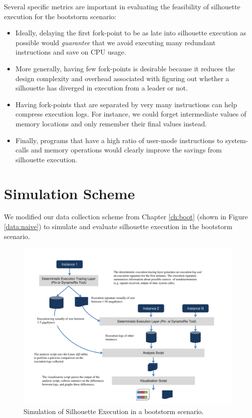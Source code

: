 Several specific metrics are important in
evaluating the feasibility of silhouette
execution for the bootstorm scenario:
\begin{itemize}
\item Ideally, delaying the first fork-point
to be as late into silhouette execution as possible
would {\em guarantee} that we avoid
executing many redundant instructions and
save on CPU usage.
\item More generally, having few
fork-points is desirable because it reduces
the design complexity and overhead associated with 
figuring out whether a silhouette has diverged
in execution from a leader or not.
\item Having fork-points that are
separated by very many instructions
can help compress execution logs.
For instance, we could forget intermediate
values of memory locations and only
remember their final values instead.
\item Finally, programs that have a high
ratio of user-mode instructions to system-calls
and memory operations would clearly 
improve the savings from silhouette execution.
\end{itemize}

\section{Simulation Scheme} \label{silsimulation}
We modified our data collection scheme from Chapter \ref{ch:boot} (shown in 
Figure \ref{data:naive}) to simulate and
evaluate silhouette execution in the bootstorm scenario.

\begin{figure}[h]
  \center
  \includegraphics[scale=0.7, trim=1cm 0cm 1cm 0cm]
                  {simulation.pdf}
  \caption[Simulation of Silhouette Execution in a bootstorm scenario]%
  {Simulation of Silhouette Execution in a bootstorm scenario.}
  \label{ch3:figsimulation}
\end{figure}

